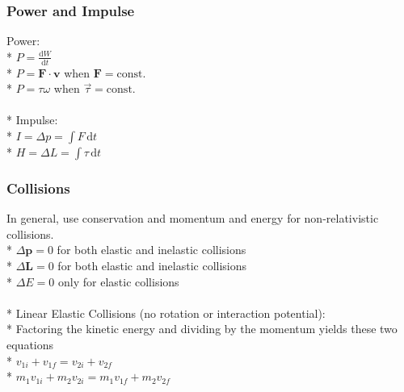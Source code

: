 \subsubsection{Power and Impulse}
Power:\\*
\(P=\frac{\mathrm{d}W}{\mathrm{d}t} \)\\*
\( P=\mathbf{F}\cdot\mathbf{v}\) when \( \mathbf{F}=\mathrm{const.} \)\\*
\( P=\tau\omega\) when \( \vec{\tau}=\mathrm{const.} \)\\\\*
Impulse:\\*
\(I=\Delta p=\int F\,\mathrm{d}t\)\\*
\(H=\Delta L=\int \tau\,\mathrm{d}t\)

\subsubsection{Collisions}
In general, use conservation and momentum and energy for non-relativistic collisions.\\*
\(\Delta \mathbf{p}=0\) for both elastic and inelastic collisions\\*
\(\Delta \mathbf{L}=0\) for both elastic and inelastic collisions\\*
\(\Delta E=0\) only for elastic collisions\\\\*
Linear Elastic Collisions (no rotation or interaction potential):\\*
Factoring the kinetic energy and dividing by the momentum yields these two equations\\*
\( v_{1i} + v_{1f} = v_{2i} + v_{2f} \)\\*
\(m_1 v_{1i}+m_2v_{2i}=m_1 v_{1f}+m_2v_{2f}\)

